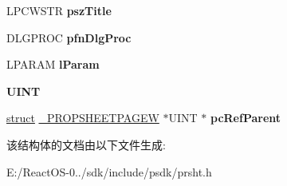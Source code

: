 \begin{DoxyCompactItemize}
\begin{tabbing}
\end{tabbing}\item 
\mbox{\label{struct___p_r_o_p_s_h_e_e_t_p_a_g_e_w_ac8276347529fbac08819b8dc82d612ab}} 
L\+P\+C\+W\+S\+TR {\bfseries psz\+Title}
\item 
\mbox{\label{struct___p_r_o_p_s_h_e_e_t_p_a_g_e_w_a2bbba0f4fa150528df2b526f417753e0}} 
D\+L\+G\+P\+R\+OC {\bfseries pfn\+Dlg\+Proc}
\item 
\mbox{\label{struct___p_r_o_p_s_h_e_e_t_p_a_g_e_w_a779c3ae3938abe9640d7f9d919efdfd7}} 
L\+P\+A\+R\+AM {\bfseries l\+Param}
\item 
\mbox{\label{struct___p_r_o_p_s_h_e_e_t_p_a_g_e_w_a4cd516375d807d0e5bd21d3134a79795}} 
{\bfseries U\+I\+NT}
\item 
\mbox{\label{struct___p_r_o_p_s_h_e_e_t_p_a_g_e_w_ac583b215d69bebeedd7008487839808e}} 
\hyperlink{interfacestruct}{struct} \hyperlink{struct___p_r_o_p_s_h_e_e_t_p_a_g_e_w}{\+\_\+\+P\+R\+O\+P\+S\+H\+E\+E\+T\+P\+A\+G\+EW} $\ast$U\+I\+NT $\ast$ {\bfseries pc\+Ref\+Parent}
\end{DoxyCompactItemize}


该结构体的文档由以下文件生成\+:\begin{DoxyCompactItemize}
\item 
E\+:/\+React\+O\+S-\/0../sdk/include/psdk/prsht.\+h\end{DoxyCompactItemize}
